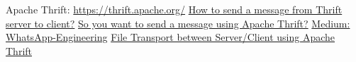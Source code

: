 \documentclass[a4paper,10pt]{article}
\begin{document}
\begin{thebibliography}{}
     Apache Thrift: \url{https://thrift.apache.org/}
     \href{http://mail-archives.apache.org/mod\_mbox/thrift-user/201010.mbox/\%3CAANLkTi=Mt4A2YhcDy0GA7pY52O7jSTWmqEoh1E=HzEbw@mail.gmail.com\%3E}{How to send a message from Thrift server to client?}
     \href{https://sookocheff.com/post/thrift/so-you-want-to-use-thrift/}{So you want to send a message using Apache Thrift?}
     \href{https://medium.com/codingurukul/whatsapp-engineering-inside-1-1ef4845ff784}{Medium: WhatsApp-Engineering}
     \href{https://stackoverflow.com/questions/20960541/file-transport-between-server-client}{File Transport between Server/Client using Apache Thrift}
\end{thebibliography}
\end{document}
